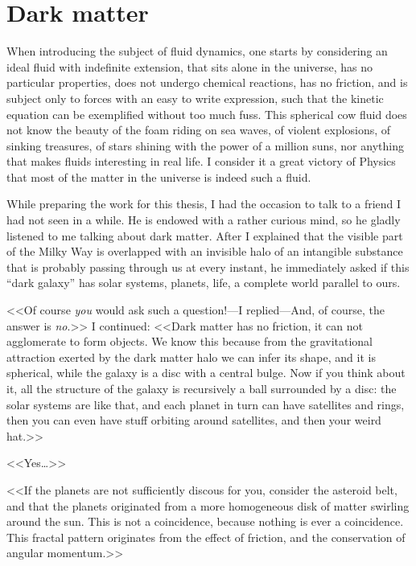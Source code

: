 \chapter{Dark matter}

When introducing the subject of fluid dynamics, one starts by considering an
ideal fluid with indefinite extension, that sits alone in the universe, has no
particular properties, does not undergo chemical reactions, has no friction,
and is subject only to forces with an easy to write expression, such that the
kinetic equation can be exemplified without too much fuss. This spherical cow
fluid does not know the beauty of the foam riding on sea waves, of violent
explosions, of sinking treasures, of stars shining with the power of a million
suns, nor anything that makes fluids interesting in real life. I consider it a
great victory of Physics that most of the matter in the universe is indeed such
a fluid.

While preparing the work for this thesis, I had the occasion to talk to a
friend I had not seen in a while. He is endowed with a rather curious mind, so
he gladly listened to me talking about dark matter. After I explained that the
visible part of the Milky Way is overlapped with an invisible halo of an
intangible substance that is probably passing through us at every instant, he
immediately asked if this ``dark galaxy'' has solar systems, planets, life,
a complete world parallel to ours.

<<Of course \emph{you} would ask such a question!---I replied---And, of course,
the answer is \emph{no}.>> I continued: <<Dark matter has no friction, it can
not agglomerate to form objects. We know this because from the gravitational
attraction exerted by the dark matter halo we can infer its shape, and it is
spherical, while the galaxy is a disc with a central bulge. Now if you think
about it, all the structure of the galaxy is recursively a ball surrounded by a
disc: the solar systems are like that, and each planet in turn can have
satellites and rings, then you can even have stuff orbiting around satellites,
and then your weird hat.>>

<<Yes\ldots>>

<<If the planets are not sufficiently discous for you, consider the asteroid
belt, and that the planets originated from a more homogeneous disk of matter
swirling around the sun. This is not a coincidence, because nothing is ever a
coincidence. This fractal pattern originates from the effect of friction, and
the conservation of angular momentum.>>

